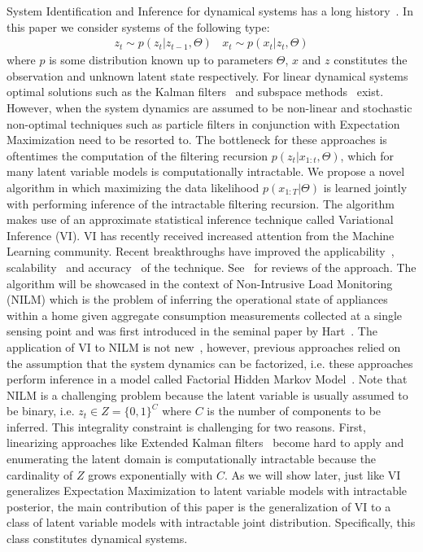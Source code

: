 System Identification and Inference for dynamical systems has a long history~\cite{ljung1998system}. In this paper we consider systems of the following type:
\begin{align*}
z_t \sim p(z_t | z_{t-1}, \Theta) \> \> \> \>x_t \sim p(x_t | z_t, \Theta)
\end{align*}
where $p$ is some distribution known up to parameters $\Theta$, $x$ and $z$ constitutes the observation and unknown latent state respectively. For linear dynamical systems optimal solutions such as the Kalman filters~\cite{kalman1960contributions} and subspace methods~\cite{van2012subspace} exist. However, when the system dynamics are assumed to be non-linear and stochastic non-optimal techniques such as particle filters in conjunction with Expectation Maximization need to be resorted to. The bottleneck for these approaches is oftentimes the computation of the filtering recursion $p(z_t | x_{1:t},\Theta)$, which for many latent variable models is computationally intractable. 
We propose a novel algorithm in which maximizing the data likelihood $p(x_{1:T}|\Theta)$ is learned jointly with performing inference of the intractable filtering recursion. The algorithm makes use of an approximate statistical inference technique called Variational Inference (VI). VI has recently received increased attention from the Machine Learning community. Recent breakthroughs have improved the applicability~\cite{ranganath2014black}, scalability~\cite{hoffman2013stochastic,kingma2013auto} and accuracy~\cite{rezende2015variational,lange2018factornet} of the technique. See~\cite{zhang2017advances,blei2017variational} for reviews of the approach. 
The algorithm will be showcased in the context of Non-Intrusive Load Monitoring~\cite{hart1992nonintrusive} (NILM) which is the problem of inferring the operational state of appliances within a home given aggregate consumption measurements collected at a single sensing point and was first introduced in the seminal paper by Hart~\cite{hart1992nonintrusive}. The application of VI to NILM is not new~\cite{lange2018varbolt,ng2016scaling}, however, previous approaches relied on the assumption that the system dynamics can be factorized, i.e. these approaches perform inference in a model called Factorial Hidden Markov Model~\cite{ghahramani1996factorial}. Note that NILM is a challenging problem because the latent variable is usually assumed to be binary, i.e. $z_t \in Z = \{0,1\}^C$ where $C$ is the number of components to be inferred. This integrality constraint is challenging for two reasons. First, linearizing approaches like Extended Kalman filters~\cite{hoshiya1984structural} become hard to apply and enumerating the latent domain is computationally intractable because the cardinality of $Z$ grows exponentially with $C$. As we will show later, just like VI generalizes Expectation Maximization to latent variable models with intractable posterior, the main contribution of this paper is the generalization of VI to a class of latent variable models with intractable joint distribution. Specifically, this class constitutes dynamical systems.
